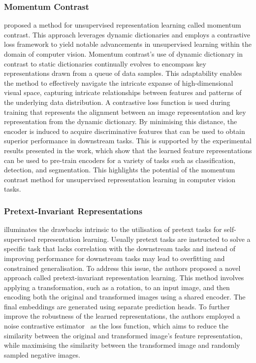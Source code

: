 \subsubsection{Momentum Contrast}
\label{subsubsec:momentum_contrast}
\cite{he2020momentum} proposed a method for unsupervised representation learning called momentum contrast. This approach leverages dynamic dictionaries and employs a contrastive loss framework to yield notable advancements in unsupervised learning within the domain of computer vision. Momentum contrast’s use of dynamic dictionary in contrast to static dictionaries continually evolves to encompass key representations drawn from a queue of data samples. This adaptability enables the method to effectively navigate the intricate expanse of high-dimensional visual space, capturing intricate relationships between features and patterns of the underlying data distribution. A contrastive loss function is used during training that represents the alignment between an image representation and key representation from the dynamic dictionary. By minimising this distance, the encoder is induced to acquire discriminative features that can be used to obtain superior performance in downstream tasks. This is supported by the experimental results presented in the work, which show that the learned feature representations can be used to pre-train encoders for a variety of tasks such as classification, detection, and segmentation. This highlights the potential of the momentum contrast method for unsupervised representation learning in computer vision tasks.

\subsubsection{Pretext-Invariant Representations}
\label{subsubsec:pretext_invariant_representations}
\cite{misra2020self} illuminates the drawbacks intrinsic to the utilisation of pretext tasks for self-supervised representation learning. Usually pretext tasks are instructed to solve a specific task that lacks correlation with the downstream tasks and instead of improving performance for downstream tasks may lead to overfitting and constrained generalisation. To address this issue, the authors proposed a novel approach called pretext-invariant representation learning. This method involves applying a transformation, such as a rotation, to an input image, and then encoding both the original and transformed images using a shared encoder. The final embeddings are generated using separate prediction heads. To further improve the robustness of the learned representations, the authors employed a noise contrastive estimator~\citep{gutmann2010noise} as the loss function, which aims to reduce the similarity between the original and transformed image’s feature representation, while maximising the similarity between the transformed image and randomly sampled negative images. 

